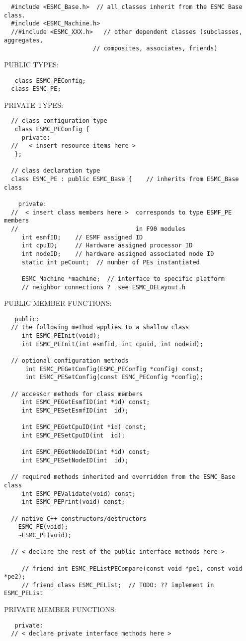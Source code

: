 \begin{verbatim}  #include <ESMC_Base.h>  // all classes inherit from the ESMC Base class.
  #include <ESMC_Machine.h>  
  //#include <ESMC_XXX.h>   // other dependent classes (subclasses, aggregates,
                         // composites, associates, friends)
 \end{verbatim}{\sf PUBLIC TYPES:}
\begin{verbatim}   class ESMC_PEConfig;
  class ESMC_PE;
 \end{verbatim}{\sf PRIVATE TYPES:}
\begin{verbatim} 
  // class configuration type
   class ESMC_PEConfig {
     private:
  //   < insert resource items here >
   };
 
  // class declaration type
  class ESMC_PE : public ESMC_Base {    // inherits from ESMC_Base class
 
    private:
  //  < insert class members here >  corresponds to type ESMF_PE members
  //                                 in F90 modules
     int esmfID;    // ESMF assigned ID
     int cpuID;     // Hardware assigned processor ID
     int nodeID;    // hardware assigned associated node ID
     static int peCount;  // number of PEs instantiated
 
     ESMC_Machine *machine;  // interface to specific platform
     // neighbor connections ?  see ESMC_DELayout.h
 \end{verbatim}{\sf PUBLIC MEMBER FUNCTIONS:}
\begin{verbatim}   public:
  // the following method applies to a shallow class
     int ESMC_PEInit(void);
     int ESMC_PEInit(int esmfid, int cpuid, int nodeid);
 
  // optional configuration methods
      int ESMC_PEGetConfig(ESMC_PEConfig *config) const;
      int ESMC_PESetConfig(const ESMC_PEConfig *config);
 
  // accessor methods for class members
     int ESMC_PEGetEsmfID(int *id) const;
     int ESMC_PESetEsmfID(int  id);
 
     int ESMC_PEGetCpuID(int *id) const;
     int ESMC_PESetCpuID(int  id);
 
     int ESMC_PEGetNodeID(int *id) const;
     int ESMC_PESetNodeID(int  id);
     
  // required methods inherited and overridden from the ESMC_Base class
     int ESMC_PEValidate(void) const;
     int ESMC_PEPrint(void) const;
 
  // native C++ constructors/destructors
 	ESMC_PE(void);
 	~ESMC_PE(void);
   
  // < declare the rest of the public interface methods here >
 
     // friend int ESMC_PEListPECompare(const void *pe1, const void *pe2);
     // friend class ESMC_PEList;  // TODO: ?? implement in ESMC_PEList
   \end{verbatim}{\sf PRIVATE MEMBER FUNCTIONS:}
\begin{verbatim}   private: 
  // < declare private interface methods here >\end{verbatim}

